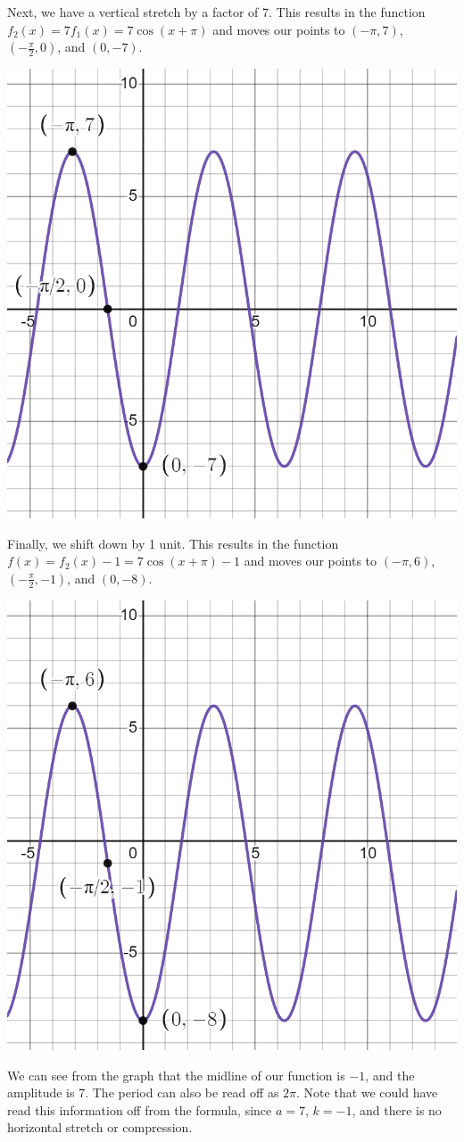 \documentclass{ximera}
\begin{document}
\begin{example}
\begin{explanation}
Next, we have a vertical stretch by a factor of 7. This results in the function $f_2(x) = 7f_1(x) = 7\cos(x + \pi)$ and moves our points to $(-\pi, 7)$, $\left(-\frac{\pi}{2}, 0\right)$, and $(0, -7)$.
\begin{image}
\includegraphics[width=0.8\linewidth]{images/graph-ex3.png}
\end{image} 

Finally, we shift down by 1 unit. This results in the function $f(x) = f_2(x) - 1 = 7\cos(x + \pi) - 1$ and moves our points to $(-\pi, 6)$, $\left(-\frac{\pi}{2}, -1\right)$, and $(0, -8)$.
\begin{image}
\includegraphics[width=0.8\linewidth]{images/graph-ex4.png}
\end{image} 
\end{explanation}

We can see from the graph that the midline of our function is $-1$, and the amplitude is 7. The period can also be read off as $2\pi$. Note that we could have read this information off from the formula, since $a = 7$, $k = -1$, and there is no horizontal stretch or compression.
\end{example}
\end{document}
